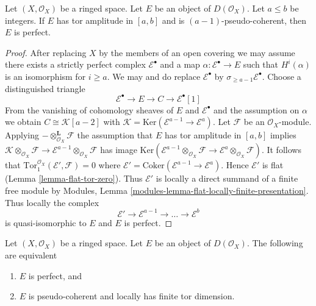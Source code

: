 \begin{lemma}
\label{lemma-perfect-precise}
Let $(X, \mathcal{O}_X)$ be a ringed space.
Let $E$ be an object of $D(\mathcal{O}_X)$.
Let $a \leq b$ be integers. If $E$ has tor amplitude in $[a, b]$
and is $(a - 1)$-pseudo-coherent, then $E$ is perfect.
\end{lemma}

\begin{proof}
After replacing $X$ by the members of an open covering we may assume there
exists a strictly perfect complex $\mathcal{E}^\bullet$ and a map
$\alpha : \mathcal{E}^\bullet \to E$ such that $H^i(\alpha)$ is an isomorphism
for $i \geq a$. We may and do replace $\mathcal{E}^\bullet$ by
$\sigma_{\geq a - 1}\mathcal{E}^\bullet$. Choose a distinguished triangle
$$
\mathcal{E}^\bullet \to E \to C \to \mathcal{E}^\bullet[1]
$$
From the vanishing of cohomology sheaves of $E$ and $\mathcal{E}^\bullet$
and the assumption on $\alpha$ we obtain $C \cong \mathcal{K}[a - 2]$ with
$\mathcal{K} = \text{Ker}(\mathcal{E}^{a - 1} \to \mathcal{E}^a)$.
Let $\mathcal{F}$ be an $\mathcal{O}_X$-module.
Applying $- \otimes_{\mathcal{O}_X}^\mathbf{L} \mathcal{F}$
the assumption that $E$ has tor amplitude in $[a, b]$
implies $\mathcal{K} \otimes_{\mathcal{O}_X} \mathcal{F} \to
\mathcal{E}^{a - 1} \otimes_{\mathcal{O}_X} \mathcal{F}$ has image
$\text{Ker}(\mathcal{E}^{a - 1} \otimes_{\mathcal{O}_X} \mathcal{F}
\to \mathcal{E}^a \otimes_{\mathcal{O}_X} \mathcal{F})$.
It follows that $\text{Tor}_1^{\mathcal{O}_X}(\mathcal{E}', \mathcal{F}) = 0$
where $\mathcal{E}' = \text{Coker}(\mathcal{E}^{a - 1} \to \mathcal{E}^a)$.
Hence $\mathcal{E}'$ is flat (Lemma \ref{lemma-flat-tor-zero}).
Thus $\mathcal{E}'$ is locally a direct summand of a finite free module by
Modules, Lemma \ref{modules-lemma-flat-locally-finite-presentation}.
Thus locally the complex
$$
\mathcal{E}' \to \mathcal{E}^{a - 1} \to \ldots \to \mathcal{E}^b
$$
is quasi-isomorphic to $E$ and $E$ is perfect.
\end{proof}

\begin{lemma}
\label{lemma-perfect}
Let $(X, \mathcal{O}_X)$ be a ringed space.
Let $E$ be an object of $D(\mathcal{O}_X)$.
The following are equivalent
\begin{enumerate}
\item $E$ is perfect, and
\item $E$ is pseudo-coherent and locally has finite tor dimension.
\end{enumerate}
\end{lemma}

